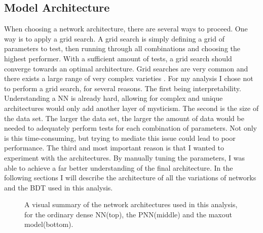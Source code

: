 \subsection{Model Architecture}\label{subsec:arch}
When choosing a network architecture, there are several ways to proceed. One way is to apply a grid search.
A grid search is simply defining a grid of parameters to test, then running through all combinations and 
choosing the highest performer. With a sufficient amount of tests, a grid search should converge towards 
an optimal architecture. Grid searches are very common and there exists a large range of very complex varieties \cite{GS}.
For my analysis I chose not to perform a grid search, for several reasons. The first being interpretability.
Understanding a \ac{NN} is already hard, allowing for complex and unique architectures would only add another layer
of mysticism. The second is the size of the data set. The larger the data set, the larger the amount of data 
would be needed to adequately perform tests for each combination of parameters. Not only is this time-consuming,
but trying to mediate this issue could lead to poor performance. The third and most important reason is that 
I wanted to experiment with the architectures. By manually tuning the parameters, I was able to achieve a far 
better understanding of the final architecture. In the following sections I will describe the architecture of all the 
variations of networks and the \ac{BDT} used in this analysis.
\begin{figure}
    \caption{A visual summary of the network architectures used in this analysis, for the ordinary dense \acs{NN}(top), the \acs{PNN}(middle)
    and the maxout model(bottom).}
    \label{fig:arch}
\end{figure}
